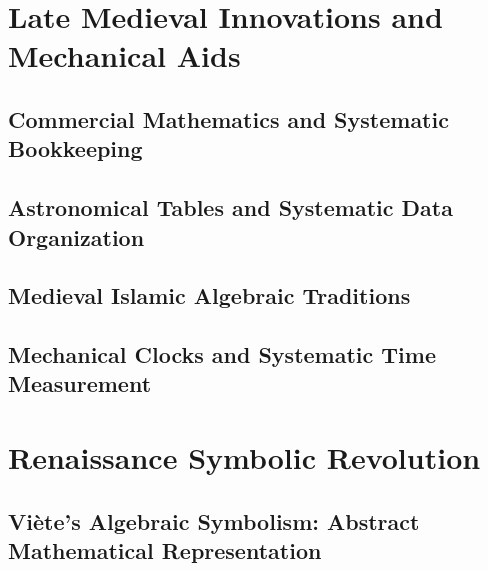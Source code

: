 \documentclass[12pt, oneside, openany]{book}
\begin{document}
\chapter{Late Medieval Innovations and Mechanical Aids}

\section{Commercial Mathematics and Systematic Bookkeeping}

\section{Astronomical Tables and Systematic Data Organization}

\section{Medieval Islamic Algebraic Traditions}

\section{Mechanical Clocks and Systematic Time Measurement}


\chapter{Renaissance Symbolic Revolution}

\section{Viète's Algebraic Symbolism: Abstract Mathematical Representation}
\end{document}
